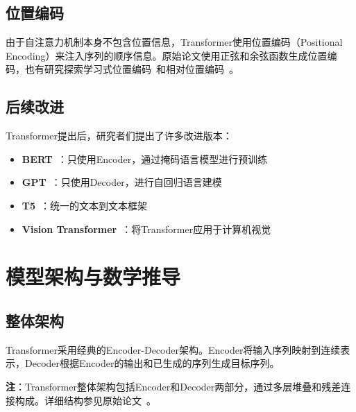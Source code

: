 \documentclass[UTF8,12pt,a4paper]{ctexart}
\begin{document}
\subsection{位置编码}

由于自注意力机制本身不包含位置信息，Transformer使用位置编码（Positional Encoding）来注入序列的顺序信息。原始论文使用正弦和余弦函数生成位置编码，也有研究探索学习式位置编码~\cite{gehring2017convolutional}和相对位置编码~\cite{shaw2018self}。

\subsection{后续改进}

Transformer提出后，研究者们提出了许多改进版本：

\begin{itemize}
    \item \textbf{BERT}~\cite{devlin2018bert}：只使用Encoder，通过掩码语言模型进行预训练
    \item \textbf{GPT}~\cite{radford2019language}：只使用Decoder，进行自回归语言建模
    \item \textbf{T5}~\cite{raffel2020exploring}：统一的文本到文本框架
    \item \textbf{Vision Transformer}~\cite{dosovitskiy2020image}：将Transformer应用于计算机视觉
\end{itemize}

\section{模型架构与数学推导}

\subsection{整体架构}

Transformer采用经典的Encoder-Decoder架构。Encoder将输入序列映射到连续表示，Decoder根据Encoder的输出和已生成的序列生成目标序列。


\noindent\textbf{注}：Transformer整体架构包括Encoder和Decoder两部分，通过多层堆叠和残差连接构成。详细结构参见原始论文~\cite{vaswani2017attention}。
\end{document}
